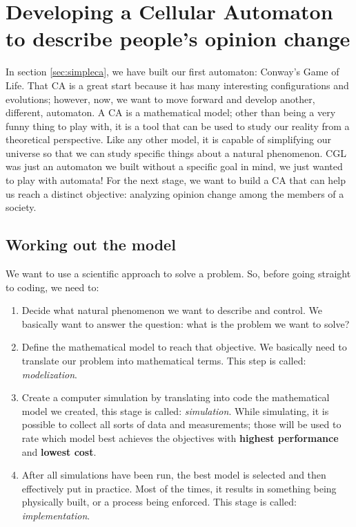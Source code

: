 
\chapter[A Cellular Automaton to describe opinion change]{Developing a
Cellular Automaton to describe people's opinion change}
\label{sec:opinionca}

In section \ref{sec:simpleca}, we have built our first automaton: Conway's Game of Life.
That CA is a great start because it has many interesting configurations and evolutions;
however, now, we want to move forward and develop another, different, automaton.
A CA is a mathematical model; other than being a very funny thing to play with, it is a
tool that can be used to study our reality from a theoretical perspective. Like any other
model, it is capable of simplifying our universe so that we can study specific things
about a natural phenomenon. CGL was just an automaton we built without a specific goal
in mind, we just wanted to play with automata!
For the next stage, we want to build a CA that can help us reach a distinct objective:
analyzing opinion change among the members of a society.

\section{Working out the model}
We want to use a scientific approach to solve a problem. So, 
before going straight to coding, we need to:

\begin{enumerate}
\item Decide what natural phenomenon we want to describe and control. 
We basically want to answer the question: what is the problem we want to solve?
\item Define the mathematical model to reach that objective. We 
basically need to translate
our problem into mathematical terms. This step is called: \textit{modelization}.
\item Create a computer simulation by translating into code the mathematical
model we created, this stage is called: \textit{simulation}. While simulating,
it is possible to collect all sorts of data and measurements; those will be used
to rate which model best achieves the objectives with \textbf{highest performance} and
\textbf{lowest cost}.
\item After all simulations have been run, the best model is selected and then
effectively put in practice. Most of the times, it results in something being
physically built, or a process being enforced. This stage is called:
\textit{implementation}.
\end{enumerate}

